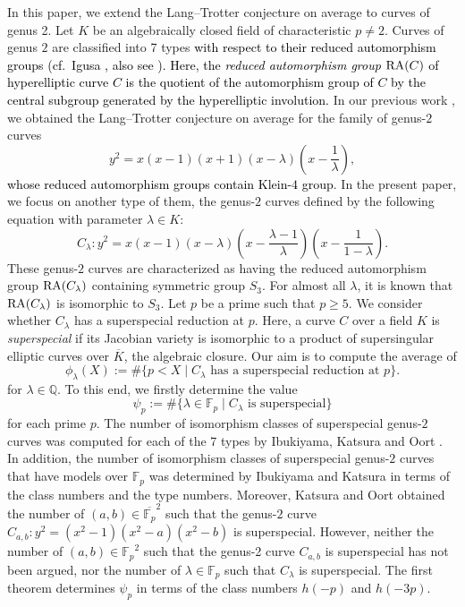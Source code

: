 \documentclass[a4paper, 11pt]{article}
\theoremstyle{plain}
\newcommand{\?}{\textcolor{red}{??}}
\newcommand{\lm}{\lambda}
\newcommand{\fp}{\mathbb{F}_p}
\newcommand{\bQ}{\mathbb{Q}}
\begin{document}
In this paper, we extend the Lang--Trotter conjecture on average to curves of genus 2. Let $K$ be an algebraically closed field of characteristic $p \ne 2$. Curves of genus $2$ are
classified into 7 types \textcolor{black}{with respect to their reduced automorphism groups (cf.\ Igusa \cite[\S\ 8]{Igusa}, also see \cite[1.2]{IKO02}). Here, the \textit{reduced automorphism group} ${\rm RA}(C)$ of hyperelliptic curve $C$ is the quotient of the automorphism group of $C$ by the central subgroup generated by the hyperelliptic involution.} 
In our previous work \cite{Ando}, we obtained the Lang--Trotter conjecture on average for the family of genus-$2$ curves
\[
y^2=x(x-1)(x+1)(x-{\lambda}) \left(x-\frac{1}{\lambda}\right),
\]
\textcolor{black}{whose reduced automorphism groups contain Klein-$4$ group}.
In the present paper, we focus on another type of them, the genus-$2$ curves defined by the following equation with parameter $\lm \in K$:
\[
C_{\lm}:y^2=x(x-1)(x-{\lambda}) \left(x-\frac{\lambda-1}{\lambda}\right)\left(x-\frac{1}{1-\lambda}\right).
\]
 These genus-$2$ curves are characterized as having the reduced automorphism group ${\rm RA}(C_\lambda)$ containing symmetric group $S_3$. For almost all $\lambda$, it is known that ${\rm RA}(C_\lambda)$ is isomorphic to $S_3$. 
Let $p$ be a prime such that $p \ge 5$. We consider whether $C_{\lm}$ has a superspecial reduction at $p$.
Here, a curve $C$ over a field $K$ is \textit{superspecial} if its Jacobian variety is isomorphic to a product of supersingular elliptic curves over $\overline{K}$, the algebraic closure. 
Our aim is to compute the average of 
\[
{\phi}_{\lm}(X):= \# \lbrace p<X \mid C_{\lm} \text{ has a superspecial reduction at } p  \rbrace .
\]
for $\lm\in \bQ$. To this end, we firstly determine the value 
\[
{\psi}_{p} := \# \lbrace \lm \in \fp \mid C_{\lm} \text{ is superspecial}  \rbrace 
\]
for each prime $p$. 
The number of isomorphism classes of superspecial genus-$2$ curves was computed for each of the 7 types by
Ibukiyama, Katsura and Oort \cite{IKO02}. In addition, the number of isomorphism classes of superspecial genus-$2$ curves that have models over $\fp$ was determined by Ibukiyama and Katsura \cite{IKadd} in terms of the class numbers and the type numbers. 
Moreover, Katsura and Oort \cite{KatsuraOort} obtained the number of $(a,b) \in {\overline{\fp}}^2$ 
such that the genus-$2$ curve $C_{a,b}:y^2=(x^2-1)(x^2-a)(x^2-b)$ is superspecial.
However, neither the number of $(a,b) \in {\fp}^2$ such that the genus-2 curve $C_{a,b}$ is superspecial has not been argued, nor the number of $\lambda\in\fp$ such that $C_\lambda$ is superspecial.  The first theorem determines $\psi_p$ in terms of the class numbers $h(-p)$ and $ h(-3p)$. 
\end{document}
